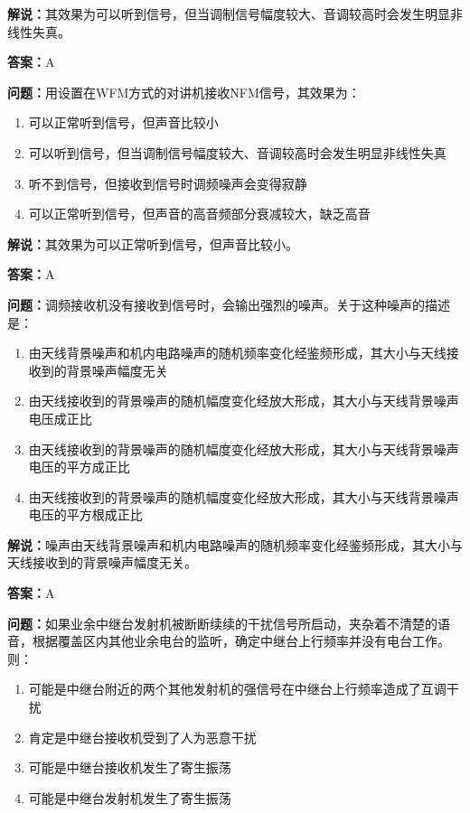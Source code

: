 \documentclass[UTF8]{ctexbook}
\begin{document}
\textbf{解说：}其效果为可以听到信号，但当调制信号幅度较大、音调较高时会发生明显非线性失真。%

\textbf{答案：}A

\textbf{问题：}用设置在WFM方式的对讲机接收NFM信号，其效果为：

\begin{enumerate}[label=\Alph*), leftmargin=3em]
  \item 可以正常听到信号，但声音比较小
  \item 可以听到信号，但当调制信号幅度较大、音调较高时会发生明显非线性失真
  \item 听不到信号，但接收到信号时调频噪声会变得寂静
  \item 可以正常听到信号，但声音的高音频部分衰减较大，缺乏高音
\end{enumerate}

\textbf{解说：}其效果为可以正常听到信号，但声音比较小。%

\textbf{答案：}A

\textbf{问题：}调频接收机没有接收到信号时，会输出强烈的噪声。关于这种噪声的描述是：

\begin{enumerate}[label=\Alph*), leftmargin=3em]
  \item 由天线背景噪声和机内电路噪声的随机频率变化经鉴频形成，其大小与天线接收到的背景噪声幅度无关
  \item 由天线接收到的背景噪声的随机幅度变化经放大形成，其大小与天线背景噪声电压成正比
  \item 由天线接收到的背景噪声的随机幅度变化经放大形成，其大小与天线背景噪声电压的平方成正比
  \item 由天线接收到的背景噪声的随机幅度变化经放大形成，其大小与天线背景噪声电压的平方根成正比
\end{enumerate}

\textbf{解说：}噪声由天线背景噪声和机内电路噪声的随机频率变化经鉴频形成，其大小与天线接收到的背景噪声幅度无关。%

\textbf{答案：}A

\textbf{问题：}如果业余中继台发射机被断断续续的干扰信号所启动，夹杂着不清楚的语音，根据覆盖区内其他业余电台的监听，确定中继台上行频率并没有电台工作。则：

\begin{enumerate}[label=\Alph*), leftmargin=3em]
  \item 可能是中继台附近的两个其他发射机的强信号在中继台上行频率造成了互调干扰
  \item 肯定是中继台接收机受到了人为恶意干扰
  \item 可能是中继台接收机发生了寄生振荡
  \item 可能是中继台发射机发生了寄生振荡
\end{enumerate}
\end{document}
